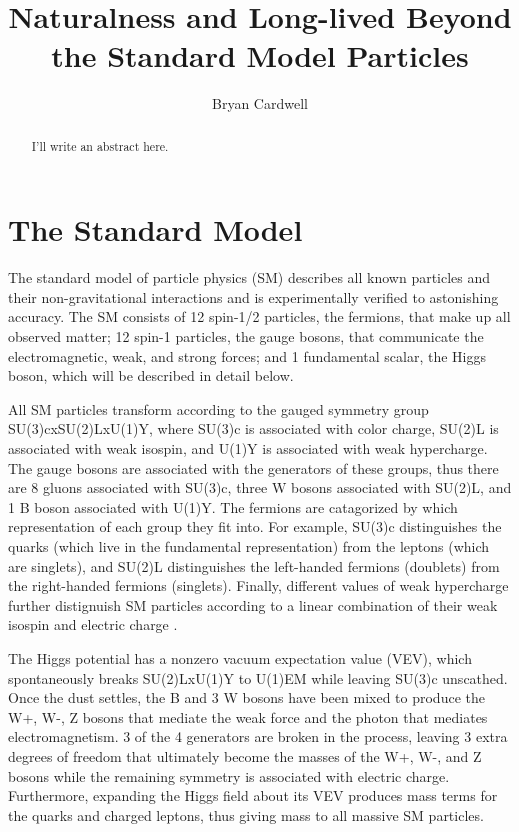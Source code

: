 \documentclass[12pt]{article}
\title{Naturalness and Long-lived Beyond the Standard Model Particles}
\author{Bryan Cardwell}
\begin{document}
\singlespacing
\maketitle

\begin{abstract}

I'll write an abstract here.

\end{abstract}

\newpage
\tableofcontents
\newpage
\doublespacing
\linenumbers
{}

\section{The Standard Model}
    The standard model of particle physics (SM) describes all known particles and their non-gravitational interactions and is experimentally verified to astonishing  accuracy. The SM consists of 12 spin-1/2 particles, the fermions, that make up all observed matter; 12 spin-1 particles, the gauge bosons, that communicate the electromagnetic, weak, and strong forces; and 1 fundamental scalar, the Higgs boson, which will be described in detail below.
    
    All SM particles transform according to the gauged symmetry group SU(3)cxSU(2)LxU(1)Y, where SU(3)c is associated with color charge, SU(2)L is associated with weak isospin, and U(1)Y is associated with weak hypercharge. The gauge bosons are associated with the generators of these groups, thus there are 8 gluons associated with SU(3)c, three W bosons associated with SU(2)L, and 1 B boson associated with U(1)Y. The fermions are catagorized by which representation of each group they fit into. For example, SU(3)c distinguishes the quarks (which live in the fundamental representation) from the leptons (which are singlets), and SU(2)L distinguishes the left-handed fermions (doublets) from the right-handed fermions (singlets). Finally, different values of weak hypercharge further distignuish SM particles according to a linear combination of their weak isospin and electric charge .

    The Higgs potential has a nonzero vacuum expectation value (VEV), which spontaneously breaks SU(2)LxU(1)Y to U(1)EM while leaving SU(3)c unscathed. Once the dust settles, the B and 3 W bosons have been mixed to produce the W+, W-, Z bosons that mediate the weak force and the photon that mediates electromagnetism. 3 of the 4 generators are broken in the process, leaving 3 extra degrees of freedom that ultimately become the masses of the W+, W-, and Z bosons while the remaining symmetry is associated with electric charge. Furthermore, expanding the Higgs field about its VEV produces mass terms for the quarks and charged leptons, thus giving mass to all massive SM particles. 
\end{document}
